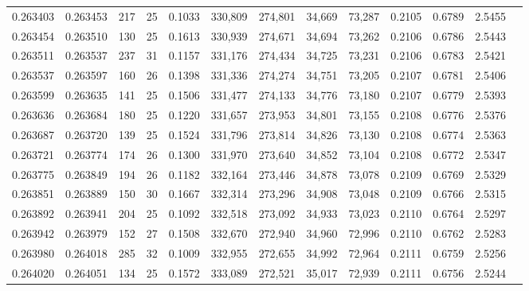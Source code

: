 \begin{tabular}{rrrrrrrrrrrrr}
0.263403 & 0.263453 &   217 &  25 &                                     0.1033 & 330,809 & 274,801 &  34,669 &  73,287 & 0.2105 & 0.6789 & 2.5455 \\
0.263454 & 0.263510 &   130 &  25 &                                     0.1613 & 330,939 & 274,671 &  34,694 &  73,262 & 0.2106 & 0.6786 & 2.5443 \\
0.263511 & 0.263537 &   237 &  31 &                                     0.1157 & 331,176 & 274,434 &  34,725 &  73,231 & 0.2106 & 0.6783 & 2.5421 \\
0.263537 & 0.263597 &   160 &  26 &                                     0.1398 & 331,336 & 274,274 &  34,751 &  73,205 & 0.2107 & 0.6781 & 2.5406 \\
0.263599 & 0.263635 &   141 &  25 &                                     0.1506 & 331,477 & 274,133 &  34,776 &  73,180 & 0.2107 & 0.6779 & 2.5393 \\
0.263636 & 0.263684 &   180 &  25 &                                     0.1220 & 331,657 & 273,953 &  34,801 &  73,155 & 0.2108 & 0.6776 & 2.5376 \\
0.263687 & 0.263720 &   139 &  25 &                                     0.1524 & 331,796 & 273,814 &  34,826 &  73,130 & 0.2108 & 0.6774 & 2.5363 \\
0.263721 & 0.263774 &   174 &  26 &                                     0.1300 & 331,970 & 273,640 &  34,852 &  73,104 & 0.2108 & 0.6772 & 2.5347 \\
0.263775 & 0.263849 &   194 &  26 &                                     0.1182 & 332,164 & 273,446 &  34,878 &  73,078 & 0.2109 & 0.6769 & 2.5329 \\
0.263851 & 0.263889 &   150 &  30 &                                     0.1667 & 332,314 & 273,296 &  34,908 &  73,048 & 0.2109 & 0.6766 & 2.5315 \\
0.263892 & 0.263941 &   204 &  25 &                                     0.1092 & 332,518 & 273,092 &  34,933 &  73,023 & 0.2110 & 0.6764 & 2.5297 \\
0.263942 & 0.263979 &   152 &  27 &                                     0.1508 & 332,670 & 272,940 &  34,960 &  72,996 & 0.2110 & 0.6762 & 2.5283 \\
0.263980 & 0.264018 &   285 &  32 &                                     0.1009 & 332,955 & 272,655 &  34,992 &  72,964 & 0.2111 & 0.6759 & 2.5256 \\
0.264020 & 0.264051 &   134 &  25 &                                     0.1572 & 333,089 & 272,521 &  35,017 &  72,939 & 0.2111 & 0.6756 & 2.5244 \\

\end{tabular}
